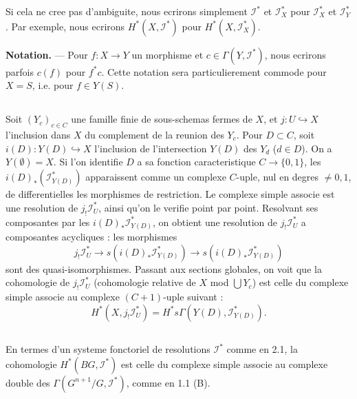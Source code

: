 \documentclass[11pt,a4paper]{article}
\theoremstyle{plain}
\theoremstyle{definition}
\begin{document}
Si cela ne cree pas d'ambiguite, nous ecrirons simplement $\mathscr{I}^*$ et $\mathscr{I}_X^*$ pour $\mathscr{I}_X^*$ et $\mathscr{I}_Y^*$. Par exemple, nous ecrirons $H^*(X, \mathscr{I}^*)$ pour $H^*(X, \mathscr{I}_X^*)$.

\textbf{Notation.} --- Pour $f : X \to Y$ un morphisme et $c \in \Gamma(Y, \mathscr{I}^*)$, nous ecrirons parfois $c(f)$ pour $f^* c$. Cette notation sera particulierement commode pour $X = S$, i.e. pour $f \in Y(S)$.

\subsection{}\label{2.2}

Soit $(Y_c)_{c \in C}$ une famille finie de sous-schemas fermes de $X$, et $j : U \hookrightarrow X$ l'inclusion dans $X$ du complement de la reunion des $Y_c$. Pour $D \subset C$, soit $i(D) : Y(D) \hookrightarrow X$ l'inclusion de l'intersection $Y(D)$ des $Y_d$ ($d \in D$). On a $Y(\emptyset) = X$. Si l'on identifie $D$ a sa fonction caracteristique $C \to \{0, 1\}$, les $i(D)_* (\mathscr{I}_{Y(D)}^*)$ apparaissent comme un complexe $C$-uple, nul en degres $\neq 0, 1$, de differentielles les morphismes de restriction. Le complexe simple associe est une resolution de $j_! \mathscr{I}_U^*$, ainsi qu'on le verifie point par point. Resolvant ses composantes par les $i(D)_* \mathscr{I}_{Y(D)}^*$, on obtient une resolution de $j_! \mathscr{I}_U^*$ a composantes acycliques : les morphismes
\begin{equation}\label{2.2.1}
j_! \mathscr{I}_U^* \to s(i(D)_* \mathscr{I}_{Y(D)}^*) \to s(i(D)_* \mathscr{I}_{Y(D)}^*)
\end{equation}
sont des quasi-isomorphismes. Passant aux sections globales, on voit que la cohomologie de $j_! \mathscr{I}_U^*$ (cohomologie relative de $X$ mod $\bigcup Y_c$) est celle du complexe simple associe au complexe $(C+1)$-uple suivant :
\begin{equation}\label{2.2.2}
H^*(X, j_! \mathscr{I}_U^*) = H^* s\Gamma(Y(D), \mathscr{I}_{Y(D)}^*).
\end{equation}

\subsection{}\label{2.3}

En termes d'un systeme fonctoriel de resolutions $\mathscr{I}^*$ comme en 2.1, la cohomologie $H^*(BG, \mathscr{I}^*)$ est celle du complexe simple associe au complexe double des $\Gamma(G^{n+1}/G, \mathscr{I}^*)$, comme en 1.1 (B).
\end{document}
